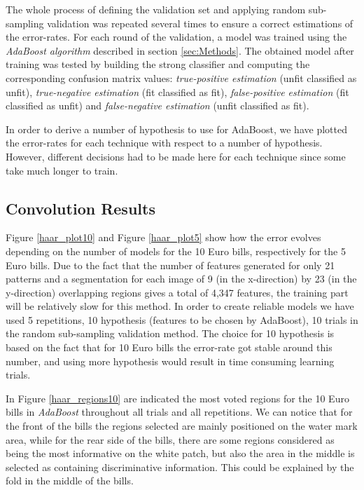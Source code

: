 \documentclass[11pt,twocolumn]{article}
\begin{document}
		The whole process of defining the validation set and applying random sub-sampling validation was repeated several times to ensure a correct estimations of the error-rates. For each round of the validation, a model was trained using the \emph{AdaBoost algorithm} described in section \ref{sec:Methods}. The obtained model after training was tested by building the strong classifier and computing the corresponding confusion matrix values: \emph{true-positive estimation} (unfit classified as unfit), \emph{true-negative estimation} (fit classified as fit), \emph{false-positive estimation} (fit classified as unfit) and \emph{false-negative estimation} (unfit classified as fit).
		
		In order to derive a number of hypothesis to use for AdaBoost, we have plotted the error-rates for each technique with respect to a number of hypothesis. However, different decisions had to be made here for each technique since some take much longer to train.

		\subsection{Convolution Results}\label{sec:haar_results}
		Figure \ref{haar_plot10} and Figure \ref{haar_plot5} show how the error evolves depending on the number of models for the 10 Euro bills, respectively for the 5 Euro bills. Due to the fact that the number of features generated for only 21 patterns and a segmentation for each image of 9 (in the x-direction) by 23 (in the y-direction) overlapping regions gives a total of 4,347 features, the training part will be relatively slow for this method. In order to create reliable models we have used 5 repetitions, 10 hypothesis (features to be chosen by AdaBoost), 10 trials in the random sub-sampling validation method. The choice for 10 hypothesis is based on the fact that for 10 Euro bills the error-rate got stable around this number, and using more hypothesis would result in time consuming learning trials.

		In Figure \ref{haar_regions10} are indicated the most voted regions for the 10 Euro bills in \emph{AdaBoost} throughout all trials and all repetitions. We can notice that for the front of the bills the regions selected are mainly positioned on the water mark area, while for the rear side of the bills, there are some regions considered as being the most informative on the white patch, but also the area in the middle is selected as containing discriminative information. This could be explained by the fold in the middle of the bills.
\end{document}
